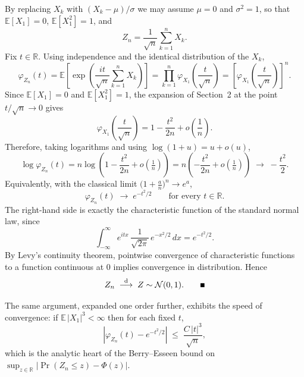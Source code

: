 \documentclass[11pt]{article}
\newcommand{\dto}{\mathrel{\overset{\mathrm{d}}{\longrightarrow}}}
\newcommand{\E}{\mathbb{E}}
\newcommand{\R}{\mathbb{R}}
\newcommand{\proofend}{\rule[0.05ex]{1.1ex}{1.1ex}}
\newcommand{\heading}[1]{\bigskip{\Large #1}\par\nobreak\smallskip}
\begin{document}
By replacing $X_k$ with $(X_k - \mu)/\sigma$ we may assume $\mu = 0$ and
$\sigma^2 = 1$, so that $\E[X_1] = 0$, $\E[X_1^2] = 1$, and
\[
  Z_n = \frac{1}{\sqrt{n}} \sum_{k=1}^{n} X_k.
\]
Fix $t \in \R$. Using independence and the identical distribution of the $X_k$,
\[
  \varphi_{Z_n}(t)
    = \E\!\left[ \exp\!\left( \frac{it}{\sqrt{n}} \sum_{k=1}^{n} X_k \right) \right]
    = \prod_{k=1}^{n} \varphi_{X_1}\!\left( \frac{t}{\sqrt{n}} \right)
    = \left[ \varphi_{X_1}\!\left( \frac{t}{\sqrt{n}} \right) \right]^{n}.
\]
Since $\E[X_1] = 0$ and $\E[X_1^2] = 1$, the expansion of Section~2 at the point
$t/\sqrt{n} \to 0$ gives
\[
  \varphi_{X_1}\!\left( \frac{t}{\sqrt{n}} \right)
    = 1 - \frac{t^2}{2n} + o\!\left( \frac{1}{n} \right).
\]
Therefore, taking logarithms and using $\log(1 + u) = u + o(u)$,
\[
  \log \varphi_{Z_n}(t)
    = n \log\!\left( 1 - \frac{t^2}{2n} + o\!\left(\tfrac{1}{n}\right) \right)
    = n \left( -\frac{t^2}{2n} + o\!\left(\tfrac{1}{n}\right) \right)
    \;\longrightarrow\; -\frac{t^2}{2}.
\]
Equivalently, with the classical limit $\bigl(1 + \tfrac{a}{n}\bigr)^{n} \to e^{a}$,
\[
  \varphi_{Z_n}(t) \;\longrightarrow\; e^{-t^2/2}
  \qquad \text{for every } t \in \R.
\]
The right-hand side is exactly the characteristic function of the standard normal
law, since
\[
  \int_{-\infty}^{\infty} e^{itx}\, \frac{1}{\sqrt{2\pi}}\, e^{-x^2/2}\, dx
    = e^{-t^2/2}.
\]
By Levy's continuity theorem, pointwise convergence of characteristic functions
to a function continuous at $0$ implies convergence in distribution. Hence
\[
  Z_n \;\dto\; Z \sim \mathcal{N}(0, 1). \qquad \proofend
\]

\heading{4.\quad Remark}

The same argument, expanded one order further, exhibits the speed of convergence:
if $\E\,|X_1|^3 < \infty$ then for each fixed $t$,
\[
  \left| \varphi_{Z_n}(t) - e^{-t^2/2} \right|
    \;\leq\; \frac{C\,|t|^3}{\sqrt{n}},
\]
which is the analytic heart of the Berry--Esseen bound on
$\sup_{z \in \R} \bigl| \Pr(Z_n \leq z) - \Phi(z) \bigr|$.
\end{document}
